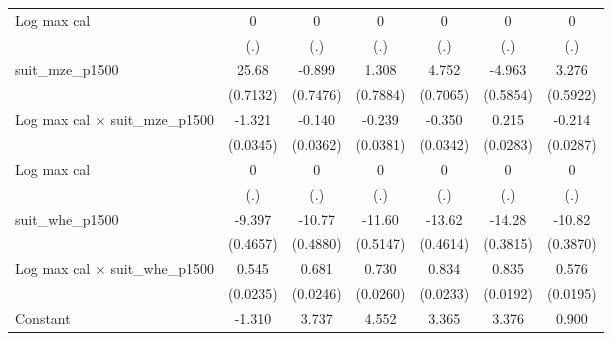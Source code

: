 {\begin{tabular}{l*{6}{c}}
\addlinespace
Log max cal         &           0         &           0         &           0         &           0         &           0         &           0         \\
                    &         (.)         &         (.)         &         (.)         &         (.)         &         (.)         &         (.)         \\
\addlinespace
suit\_mze\_p1500      &       25.68\sym{***}&      -0.899         &       1.308         &       4.752\sym{***}&      -4.963\sym{***}&       3.276\sym{***}\\
                    &    (0.7132)         &    (0.7476)         &    (0.7884)         &    (0.7065)         &    (0.5854)         &    (0.5922)         \\
\addlinespace
Log max cal $\times$ suit\_mze\_p1500&      -1.321\sym{***}&      -0.140\sym{***}&      -0.239\sym{***}&      -0.350\sym{***}&       0.215\sym{***}&      -0.214\sym{***}\\
                    &    (0.0345)         &    (0.0362)         &    (0.0381)         &    (0.0342)         &    (0.0283)         &    (0.0287)         \\
\addlinespace
Log max cal         &           0         &           0         &           0         &           0         &           0         &           0         \\
                    &         (.)         &         (.)         &         (.)         &         (.)         &         (.)         &         (.)         \\
\addlinespace
suit\_whe\_p1500      &      -9.397\sym{***}&      -10.77\sym{***}&      -11.60\sym{***}&      -13.62\sym{***}&      -14.28\sym{***}&      -10.82\sym{***}\\
                    &    (0.4657)         &    (0.4880)         &    (0.5147)         &    (0.4614)         &    (0.3815)         &    (0.3870)         \\
\addlinespace
Log max cal $\times$ suit\_whe\_p1500&       0.545\sym{***}&       0.681\sym{***}&       0.730\sym{***}&       0.834\sym{***}&       0.835\sym{***}&       0.576\sym{***}\\
                    &    (0.0235)         &    (0.0246)         &    (0.0260)         &    (0.0233)         &    (0.0192)         &    (0.0195)         \\
\addlinespace
Constant            &      -1.310\sym{***}&       3.737\sym{***}&       4.552\sym{***}&       3.365\sym{***}&       3.376\sym{***}&       0.900\sym{***}\\

\end{tabular}}
